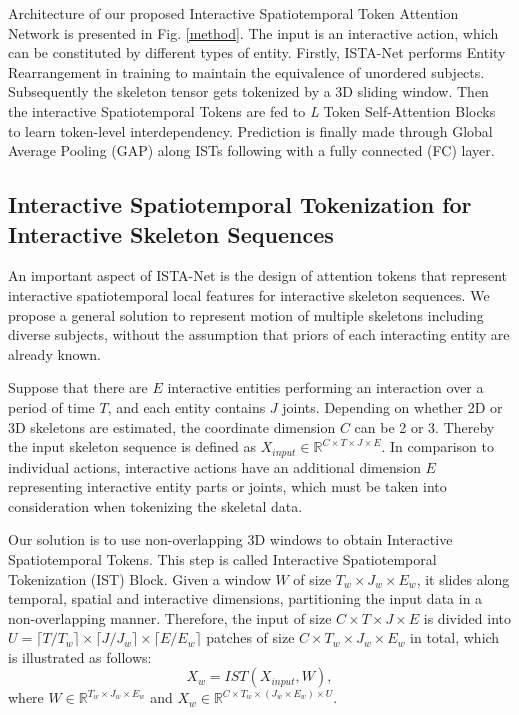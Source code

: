 \documentclass[letterpaper, 10 pt, conference]{ieeeconf}
\begin{document}
Architecture of our proposed Interactive Spatiotemporal Token Attention Network is presented in Fig. \ref{method}. The input is an interactive action, which can be constituted by different types of entity. Firstly, ISTA-Net performs Entity Rearrangement in training to maintain the equivalence of unordered subjects. Subsequently the skeleton tensor gets tokenized by a 3D sliding window. Then the interactive Spatiotemporal Tokens are fed to \textit{L} Token Self-Attention Blocks to learn token-level interdependency. Prediction is finally made through Global Average Pooling (GAP) along ISTs following with a fully connected (FC) layer.

\subsection{Interactive Spatiotemporal Tokenization for Interactive Skeleton Sequences}

An important aspect of ISTA-Net is the design of attention tokens that represent interactive spatiotemporal local features for interactive skeleton sequences. We propose a general solution to represent motion of multiple skeletons including diverse subjects, without the assumption that priors of each interacting entity are already known.

Suppose that there are $E$ interactive entities performing an interaction over a period of time $T$, and each entity contains $J$ joints. Depending on whether 2D or 3D skeletons are estimated, the coordinate dimension $C$ can be 2 or 3. Thereby the input skeleton sequence is defined as $X_{input} \in \mathbb{R}^{C\times T\times J \times E}$. In comparison to individual actions, interactive actions have an additional dimension $E$ representing interactive entity parts or joints, which must be taken into consideration when tokenizing the skeletal data.

Our solution is to use non-overlapping 3D windows to obtain Interactive Spatiotemporal Tokens. This step is called Interactive Spatiotemporal Tokenization (IST) Block. Given a window $W$ of size $T_{w}\times J_{w} \times E_{w}$, it slides along temporal, spatial and interactive dimensions, partitioning the input data in a non-overlapping manner. Therefore, the input of size $C\times T\times J \times E$ is divided into $U = \lceil T/T_{w}\rceil \times \lceil J/J_{w}\rceil \times \lceil E/E_{w}\rceil$ patches of size $C\times T_{w}\times J_{w} \times E_{w}$ in total, which is illustrated as follows:
\begin{equation}
    X_{w} = IST(X_{input}, W),
\end{equation}
where $W \in \mathbb{R}^{T_{w}\times J_{w} \times E_{w}}$ and $X_{w} \in \mathbb{R}^{C\times T_{w}\times (J_{w}\times E_{w})\times U}$.
\end{document}
